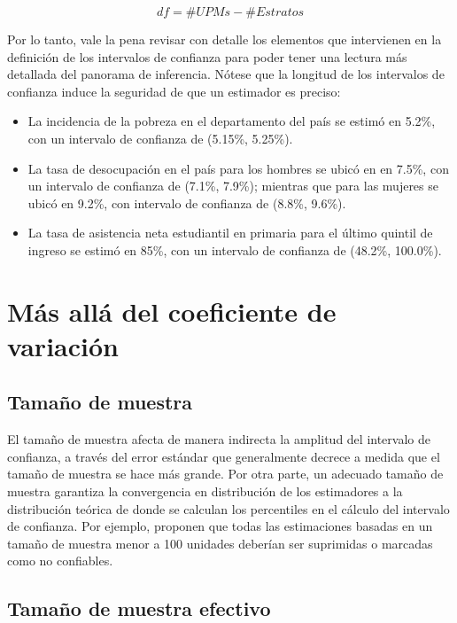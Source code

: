 \[
df = \# UPMs - \# Estratos
\]

Por lo tanto, vale la pena revisar con detalle los elementos que intervienen en la definición de los intervalos de confianza para poder tener una lectura más detallada del panorama de inferencia. Nótese que la longitud de los intervalos de confianza induce la seguridad de que un estimador es preciso:

\begin{itemize}
\tightlist
\item
  La incidencia de la pobreza en el departamento del país se estimó en 5.2\%, con un intervalo de confianza de (5.15\%, 5.25\%).
\item
  La tasa de desocupación en el país para los hombres se ubicó en en 7.5\%, con un intervalo de confianza de (7.1\%, 7.9\%); mientras que para las mujeres se ubicó en 9.2\%, con intervalo de confianza de (8.8\%, 9.6\%).
\item
  La tasa de asistencia neta estudiantil en primaria para el último quintil de ingreso se estimó en 85\%, con un intervalo de confianza de (48.2\%, 100.0\%).
\end{itemize}

\hypertarget{mas-alla-del-coeficiente-de-variacion}{%
\section{Más allá del coeficiente de variación}\label{mas-alla-del-coeficiente-de-variacion}}

\hypertarget{tamano-de-muestra-1}{%
\subsection*{Tamaño de muestra}\label{tamano-de-muestra-1}}


El tamaño de muestra afecta de manera indirecta la amplitud del intervalo de confianza, a través del error estándar que generalmente decrece a medida que el tamaño de muestra se hace más grande. Por otra parte, un adecuado tamaño de muestra garantiza la convergencia en distribución de los estimadores a la distribución teórica de donde se calculan los percentiles en el cálculo del intervalo de confianza. Por ejemplo, \citet{Barnett_Walker_Chromy_Davis_Emrich_Odom_Packer_2003} proponen que todas las estimaciones basadas en un tamaño de muestra menor a 100 unidades deberían ser suprimidas o marcadas como no confiables.

\hypertarget{tamano-de-muestra-efectivo}{%
\subsection*{Tamaño de muestra efectivo}\label{tamano-de-muestra-efectivo}}


